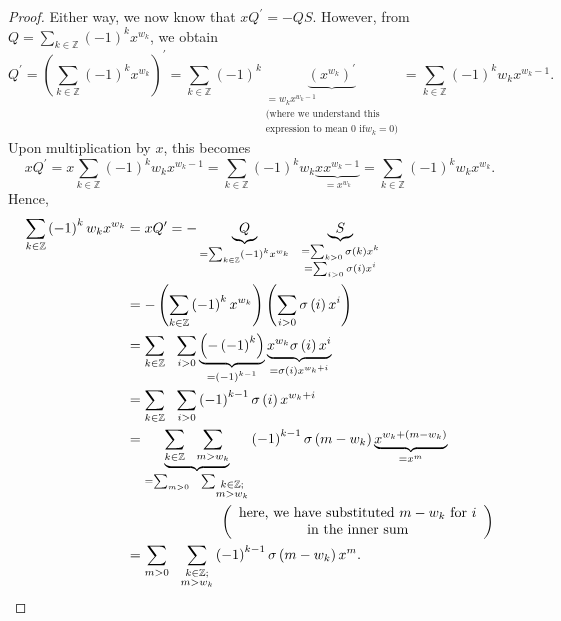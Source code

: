 \begin{proof}
Either way, we now know that $xQ^{\prime}=-QS$. However, from $Q=\sum
_{k\in\mathbb{Z}}\left(  -1\right)  ^{k}x^{w_{k}}$, we obtain%
\[
Q^{\prime}=\left(  \sum_{k\in\mathbb{Z}}\left(  -1\right)  ^{k}x^{w_{k}%
}\right)  ^{\prime}=\sum_{k\in\mathbb{Z}}\left(  -1\right)  ^{k}%
\underbrace{\left(  x^{w_{k}}\right)  ^{\prime}}_{\substack{=w_{k}x^{w_{k}%
-1}\\\text{(where we understand this}\\\text{expression to mean }0\text{ if
}w_{k}=0\text{)}}}=\sum_{k\in\mathbb{Z}}\left(  -1\right)  ^{k}w_{k}%
x^{w_{k}-1}.
\]
Upon multiplication by $x$, this becomes%
\[
xQ^{\prime}=x\sum_{k\in\mathbb{Z}}\left(  -1\right)  ^{k}w_{k}x^{w_{k}-1}%
=\sum_{k\in\mathbb{Z}}\left(  -1\right)  ^{k}w_{k}\underbrace{xx^{w_{k}-1}%
}_{=x^{w_{k}}}=\sum_{k\in\mathbb{Z}}\left(  -1\right)  ^{k}w_{k}x^{w_{k}}.
\]
Hence,%
\begin{align}
\sum_{k\in\mathbb{Z}}\left(  -1\right)  ^{k}w_{k}x^{w_{k}}  &  =xQ^{\prime
}=-\underbrace{Q}_{=\sum_{k\in\mathbb{Z}}\left(  -1\right)  ^{k}x^{w_{k}}%
}\ \ \underbrace{S}_{\substack{=\sum_{k>0}\sigma\left(  k\right)  x^{k}%
\\=\sum_{i>0}\sigma\left(  i\right)  x^{i}}}\nonumber\\
&  =-\left(  \sum_{k\in\mathbb{Z}}\left(  -1\right)  ^{k}x^{w_{k}}\right)
\left(  \sum_{i>0}\sigma\left(  i\right)  x^{i}\right) \nonumber\\
&  =\sum_{k\in\mathbb{Z}}\ \ \sum_{i>0}\underbrace{\left(  -\left(  -1\right)
^{k}\right)  }_{=\left(  -1\right)  ^{k-1}}\underbrace{x^{w_{k}}\sigma\left(
i\right)  x^{i}}_{=\sigma\left(  i\right)  x^{w_{k}+i}}\nonumber\\
&  =\sum_{k\in\mathbb{Z}}\ \ \sum_{i>0}\left(  -1\right)  ^{k-1}\sigma\left(
i\right)  x^{w_{k}+i}\nonumber\\
&  =\underbrace{\sum_{k\in\mathbb{Z}}\ \ \sum_{m>w_{k}}}_{=\sum_{m>0}%
\ \ \sum_{\substack{k\in\mathbb{Z};\\m>w_{k}}}}\left(  -1\right)  ^{k-1}%
\sigma\left(  m-w_{k}\right)  \underbrace{x^{w_{k}+\left(  m-w_{k}\right)  }%
}_{=x^{m}}\nonumber\\
&  \ \ \ \ \ \ \ \ \ \ \ \ \ \ \ \ \ \ \ \ \left(
\begin{array}
[c]{c}%
\text{here, we have substituted }m-w_{k}\text{ for }i\\
\text{in the inner sum}%
\end{array}
\right) \nonumber\\
&  =\sum_{m>0}\ \ \sum_{\substack{k\in\mathbb{Z};\\m>w_{k}}}\left(  -1\right)
^{k-1}\sigma\left(  m-w_{k}\right)  x^{m}.
\label{pf.thm.pars.euler-sum-div-rec.4}%
\end{align}



\end{proof}
